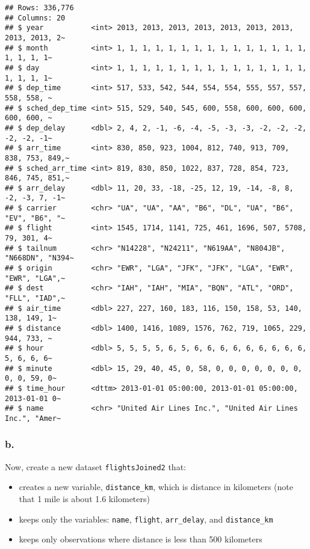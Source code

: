 \documentclass[
]{article}
\providecommand{\tightlist}{%
  \setlength{\itemsep}{0pt}\setlength{\parskip}{0pt}}
\begin{document}
\begin{verbatim}
## Rows: 336,776
## Columns: 20
## $ year           <int> 2013, 2013, 2013, 2013, 2013, 2013, 2013, 2013, 2013, 2~
## $ month          <int> 1, 1, 1, 1, 1, 1, 1, 1, 1, 1, 1, 1, 1, 1, 1, 1, 1, 1, 1~
## $ day            <int> 1, 1, 1, 1, 1, 1, 1, 1, 1, 1, 1, 1, 1, 1, 1, 1, 1, 1, 1~
## $ dep_time       <int> 517, 533, 542, 544, 554, 554, 555, 557, 557, 558, 558, ~
## $ sched_dep_time <int> 515, 529, 540, 545, 600, 558, 600, 600, 600, 600, 600, ~
## $ dep_delay      <dbl> 2, 4, 2, -1, -6, -4, -5, -3, -3, -2, -2, -2, -2, -2, -1~
## $ arr_time       <int> 830, 850, 923, 1004, 812, 740, 913, 709, 838, 753, 849,~
## $ sched_arr_time <int> 819, 830, 850, 1022, 837, 728, 854, 723, 846, 745, 851,~
## $ arr_delay      <dbl> 11, 20, 33, -18, -25, 12, 19, -14, -8, 8, -2, -3, 7, -1~
## $ carrier        <chr> "UA", "UA", "AA", "B6", "DL", "UA", "B6", "EV", "B6", "~
## $ flight         <int> 1545, 1714, 1141, 725, 461, 1696, 507, 5708, 79, 301, 4~
## $ tailnum        <chr> "N14228", "N24211", "N619AA", "N804JB", "N668DN", "N394~
## $ origin         <chr> "EWR", "LGA", "JFK", "JFK", "LGA", "EWR", "EWR", "LGA",~
## $ dest           <chr> "IAH", "IAH", "MIA", "BQN", "ATL", "ORD", "FLL", "IAD",~
## $ air_time       <dbl> 227, 227, 160, 183, 116, 150, 158, 53, 140, 138, 149, 1~
## $ distance       <dbl> 1400, 1416, 1089, 1576, 762, 719, 1065, 229, 944, 733, ~
## $ hour           <dbl> 5, 5, 5, 5, 6, 5, 6, 6, 6, 6, 6, 6, 6, 6, 6, 5, 6, 6, 6~
## $ minute         <dbl> 15, 29, 40, 45, 0, 58, 0, 0, 0, 0, 0, 0, 0, 0, 0, 59, 0~
## $ time_hour      <dttm> 2013-01-01 05:00:00, 2013-01-01 05:00:00, 2013-01-01 0~
## $ name           <chr> "United Air Lines Inc.", "United Air Lines Inc.", "Amer~
\end{verbatim}

\hypertarget{b.}{%
\subsubsection{b.}\label{b.}}

Now, create a new dataset \texttt{flightsJoined2} that:

\begin{itemize}
\tightlist
\item
  creates a new variable, \texttt{distance\_km}, which is distance in
  kilometers (note that 1 mile is about 1.6 kilometers)
\item
  keeps only the variables: \texttt{name}, \texttt{flight},
  \texttt{arr\_delay}, and \texttt{distance\_km}\\
\item
  keeps only observations where distance is less than 500 kilometers
\end{itemize}
\end{document}
